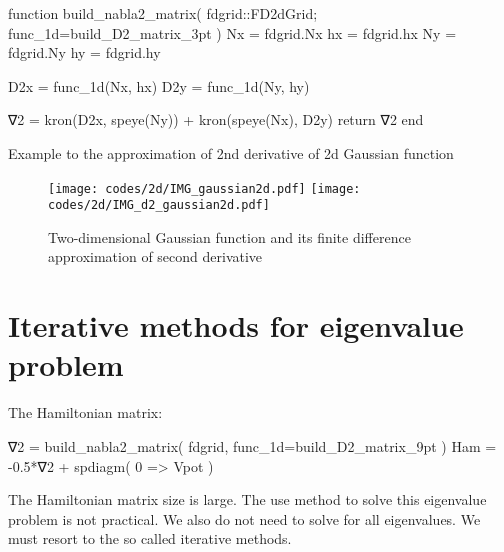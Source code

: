 \begin{juliacode}
function build_nabla2_matrix( fdgrid::FD2dGrid; func_1d=build_D2_matrix_3pt )
    Nx = fdgrid.Nx
    hx = fdgrid.hx
    Ny = fdgrid.Ny
    hy = fdgrid.hy
    
    D2x = func_1d(Nx, hx)
    D2y = func_1d(Ny, hy)

    ∇2 = kron(D2x, speye(Ny)) + kron(speye(Nx), D2y)
    return ∇2
end
\end{juliacode}

Example to the approximation of 2nd derivative of 2d Gaussian function

\begin{figure}[H]
{\center
\texttt{[image: codes/2d/IMG\_gaussian2d.pdf]}
\texttt{[image: codes/2d/IMG\_d2\_gaussian2d.pdf]}
\par}
\caption{Two-dimensional Gaussian function and its finite difference
approximation of second derivative}
\end{figure}

\section{Iterative methods for eigenvalue problem}

The Hamiltonian matrix:
\begin{juliacode}
∇2 = build_nabla2_matrix( fdgrid, func_1d=build_D2_matrix_9pt )
Ham = -0.5*∇2 + spdiagm( 0 => Vpot )
\end{juliacode}

The Hamiltonian matrix size is large. The use  method
to solve this eigenvalue problem is not practical.
We also do not need to solve for all eigenvalues.
We must resort to the
so called iterative methods.

